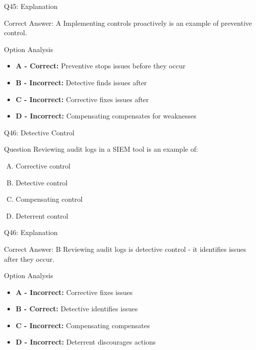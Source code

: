 \documentclass{beamer}
\begin{document}
	\begin{frame}{Q45: Explanation}
		\begin{block}{Correct Answer: A}
			Implementing controls proactively is an example of preventive control.
		\end{block}
		\begin{block}{Option Analysis}
			\begin{itemize}
				\item \textbf{A - Correct:} Preventive stops issues before they occur
				\item \textbf{B - Incorrect:} Detective finds issues after
				\item \textbf{C - Incorrect:} Corrective fixes issues after
				\item \textbf{D - Incorrect:} Compensating compensates for weaknesses
			\end{itemize}
		\end{block}
	\end{frame}
	
	\begin{frame}{Q46: Detective Control}
		\begin{block}{Question}
			Reviewing audit logs in a SIEM tool is an example of:
		\end{block}
		\begin{enumerate}[(A)]
			\item Corrective control
			\item Detective control
			\item Compensating control
			\item Deterrent control
		\end{enumerate}
	\end{frame}
	
	\begin{frame}{Q46: Explanation}
		\begin{block}{Correct Answer: B}
			Reviewing audit logs is detective control - it identifies issues after they occur.
		\end{block}
		\begin{block}{Option Analysis}
			\begin{itemize}
				\item \textbf{A - Incorrect:} Corrective fixes issues
				\item \textbf{B - Correct:} Detective identifies issues
				\item \textbf{C - Incorrect:} Compensating compensates
				\item \textbf{D - Incorrect:} Deterrent discourages actions
			\end{itemize}
		\end{block}
	\end{frame}
	
\end{document}
